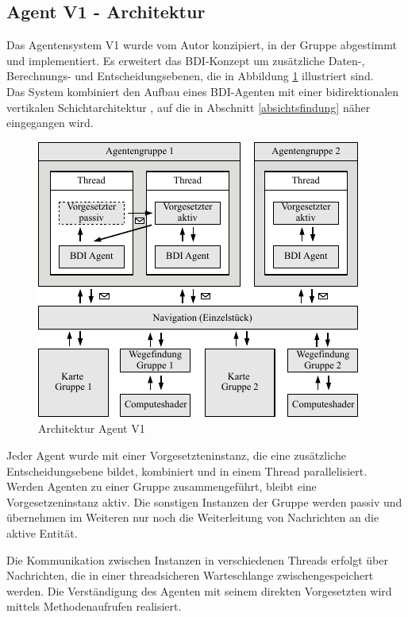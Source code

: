 \documentclass[runningheads]{llncs}
\begin{document}
\subsection{Agent V1 - Architektur}\label{agentV1}
Das Agentensystem V1 wurde vom Autor konzipiert, in der Gruppe abgestimmt und implementiert. Es erweitert das BDI-Konzept \cite{Bratman1987} um zusätzliche Daten-, Berechnungs- und Entscheidungsebenen, die in Abbildung \ref{g3:architecture} illustriert sind. \\
Das System kombiniert den Aufbau eines BDI-Agenten \cite[S. 58]{Weiss2000} mit einer bidirektionalen vertikalen Schichtarchitektur \cite[S. 61-62]{Weiss2000}, auf die in Abschnitt
\ref{absichtsfindung} näher eingegangen wird.

\begin{figure}
\includegraphics[scale=0.8]{./Referenzen/Architekturdiagramm.pdf}
\caption{Architektur Agent V1}
\label{g3:architecture}
\end{figure}
Jeder Agent wurde mit einer Vorgesetzteninstanz, die eine zusätzliche Entscheidungsebene bildet, kombiniert und in einem Thread parallelisiert. Werden Agenten zu einer Gruppe zusammengeführt, bleibt eine Vorgesetzeninstanz aktiv. Die sonstigen Instanzen der Gruppe werden passiv und übernehmen im Weiteren nur noch die Weiterleitung von Nachrichten an die aktive Entität.

Die Kommunikation zwischen Instanzen in verschiedenen Threads erfolgt über Nachrichten, die in einer threadsicheren Warteschlange zwischengespeichert werden. Die Verständigung des Agenten mit seinem direkten Vorgesetzten wird mittels Methodenaufrufen realisiert.
\end{document}
